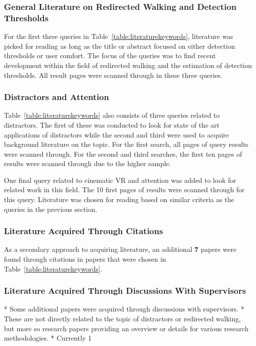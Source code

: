 \subsubsection{General Literature on Redirected Walking and Detection Thresholds}
For the first three queries in Table~\ref{table:literaturekeywords}, literature was picked for reading as long as the title or abstract focused on either detection thresholds or user comfort. The focus of the queries was to find recent development within the field of redirected walking and the estimation of detection thresholds. All result pages were scanned through in these three queries. 

\subsubsection{Distractors and Attention}
Table~\ref{table:literaturekeywords} also consists of three queries related to distractors. The first of these was conducted to look for state of the art applications of distractors while the second and third were used to acquire background literature on the topic. For the first search, all pages of query results were scanned through. For the second and third searches, the first ten pages of results were scanned through due to the higher sample. 

One final query related to cinematic VR and attention was added to look for related work in this field. The 10 first pages of results were scanned through for this query.
Literature was chosen for reading based on similar criteria as the queries in the previous section.

\subsubsection{Literature Acquired Through Citations}
As a secondary approach to acquiring literature, an additional \textbf{7} papers were found through citations in papers that were chosen in Table~\ref{table:literaturekeywords}. 

\subsubsection{Literature Acquired Through Discussions With Supervisors}
* Some additional papers were acquired through discussions with supervisors. 
* These are not directly related to the topic of distractors or redirected walking, but more so research papers providing an overview or details for various research methodologies. 
* Currently 1


